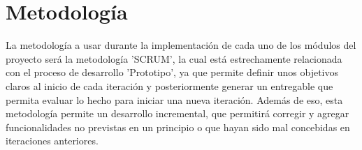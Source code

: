\section{Metodología}
La metodología a usar durante la implementación de cada uno de los módulos del proyecto será la metodología 'SCRUM', la cual está estrechamente relacionada con el proceso de desarrollo 'Prototipo', ya que permite definir unos objetivos claros al inicio de cada iteración y posteriormente generar un entregable que permita evaluar lo hecho para iniciar una nueva iteración. Además de eso, esta metodología permite un desarrollo incremental, que permitirá corregir y agregar funcionalidades no previstas en un principio o que hayan sido mal concebidas en iteraciones anteriores.